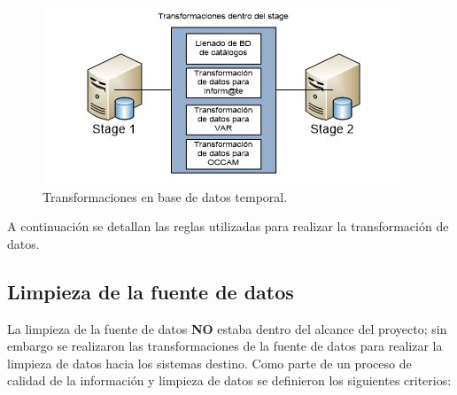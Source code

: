 \begin{figure}[htb]
  \begin{center}
    \includegraphics[width=0.7\linewidth]{Transformaciones_stage.jpg}
    \caption{Transformaciones en base de datos temporal.}
    \label{fig:transformaciones-en-base-de-datos-temporal}
  \end{center}
\end{figure}

A continuación se detallan las reglas utilizadas para realizar la transformación
de datos.

\subsection{Limpieza de la fuente de datos}

La limpieza de la fuente de datos \textbf{NO} estaba dentro del alcance del
proyecto; sin embargo se realizaron las transformaciones de la fuente de datos
para realizar la limpieza de datos hacia los sistemas destino. Como parte de un
proceso de calidad de la información y limpieza de datos se definieron los
siguientes criterios:

